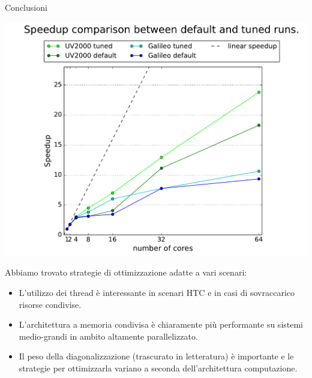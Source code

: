 \documentclass[8pt]{beamer}
\begin{document}
\begin{frame}{Conclusioni}
\vspace{-0.07\textheight}
\begin{center}
	\includegraphics[height=0.6\textheight]{beam_last_slide.pdf}	
\end{center}


\pause
Abbiamo trovato strategie di ottimizzazione adatte a vari scenari:

\begin{itemize}

	\item L'utilizzo dei thread \`e interessante in scenari HTC e in casi di sovraccarico risorse condivise.
	\pause
	\item L'architettura a memoria condivisa \`e chiaramente pi\`u performante su sistemi medio-grandi in ambito altamente parallelizzato.
	\pause
	\item Il peso della diagonalizzazione (trascurato in letteratura) \`e importante e le strategie per ottimizzarla variano a seconda dell'architettura computazione.
\end{itemize}
\end{frame}
\end{document}
